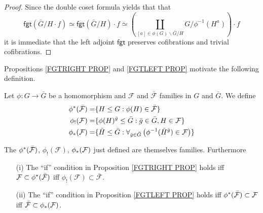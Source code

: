 \documentclass[a4paper,10pt]{article}%
\begin{document}
\begin{proof}
	Since the double coset formula yields that that
\[
	\mathsf{fgt}\left(\bar{G}/H \cdot f\right)
		\simeq 
	\mathsf{fgt}\left(\bar{G}/H\right) \cdot f
		\simeq
	\left(
		\coprod_{[a] \in \phi(G)\backslash \bar{G} /H}
		{G/\phi^{-1}(H^{a})}
	\right)	\cdot f
\]
it is immediate that the left adjoint $\mathsf{fgt}$ preserves cofibrations and trivial cofibrations.
\end{proof}


Propositions \ref{FGTRIGHT PROP} and \ref{FGTLEFT PROP}
motivate the following definition.

\begin{definition}
	Let $\phi \colon G \to \bar{G}$ be a homomorphism and $\mathcal{F}$ and $\bar{\mathcal{F}}$ families in $G$
	and $\bar{G}$. We define
\begin{align}\label{PHISTARDEF EQ}
	\phi^{\**}(\bar{\mathcal{F}})
		=&
	\{H \leq G : \phi(H) \in \bar{\mathcal{F}}\}
\\
	\phi_!(\mathcal{F})
		=&
	\{\phi(H)^{\bar{g}}\leq \bar{G} : \bar{g} \in \bar{G}, H \in \mathcal{F}\}
\\ \label{PHISTARDEF3 EQ}
	\phi_{\**}(\mathcal{F})
		=&
	\{\bar{H} \leq \bar{G} : 
	\forall_{\bar{g} \in \bar{G}} 
	\left(
	\phi^{-1}(\bar{H}^{\bar{g}}) \in \mathcal{F}
	\right)\}
\end{align}
\end{definition}

\begin{lemma}
The $\phi^{\**}(\bar{\mathcal{F}})$, $\phi_{!}(\mathcal{F})$, $\phi_{\**}(\mathcal{F})$ just defined are 
themselves families. Furthermore
\begin{itemize}
\item[(i)] The ``if'' condition in Proposition \ref{FGTRIGHT PROP} holds iff 
$\mathcal{F} \subset \phi^{\**} (\bar{\mathcal{F}})$
iff
$\phi_{!}(\mathcal{F}) \subset \bar{\mathcal{F}}$.
\item [(ii)]
The ``if'' condition in Proposition \ref{FGTLEFT PROP} holds iff 
$\phi^{\**} (\bar{\mathcal{F}}) \subset \mathcal{F}$
iff
$\bar{\mathcal{F}} \subset \phi_{\**}(\mathcal{F})$.
\end{itemize}
\end{lemma}
\end{document}
